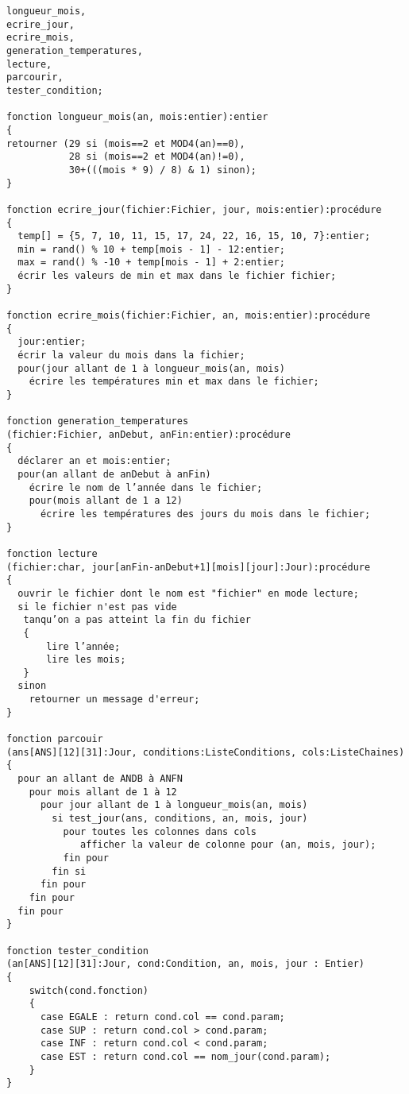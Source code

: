 \begin{lstlisting}
longueur_mois,
ecrire_jour,
ecrire_mois,
generation_temperatures,
lecture,
parcourir,
tester_condition;

fonction longueur_mois(an, mois:entier):entier
{
retourner (29 si (mois==2 et MOD4(an)==0),
           28 si (mois==2 et MOD4(an)!=0),
           30+(((mois * 9) / 8) & 1) sinon);
}

fonction ecrire_jour(fichier:Fichier, jour, mois:entier):procédure 
{
  temp[] = {5, 7, 10, 11, 15, 17, 24, 22, 16, 15, 10, 7}:entier;
  min = rand() % 10 + temp[mois - 1] - 12:entier;
  max = rand() % -10 + temp[mois - 1] + 2:entier;
  écrir les valeurs de min et max dans le fichier fichier;
}

fonction ecrire_mois(fichier:Fichier, an, mois:entier):procédure
{
  jour:entier;
  écrir la valeur du mois dans la fichier;
  pour(jour allant de 1 à longueur_mois(an, mois) 
    écrire les températures min et max dans le fichier;
}

fonction generation_temperatures
(fichier:Fichier, anDebut, anFin:entier):procédure
{
  déclarer an et mois:entier;
  pour(an allant de anDebut à anFin)
    écrire le nom de l’année dans le fichier;
    pour(mois allant de 1 a 12) 
      écrire les températures des jours du mois dans le fichier;
}

fonction lecture
(fichier:char, jour[anFin-anDebut+1][mois][jour]:Jour):procédure 
{
  ouvrir le fichier dont le nom est "fichier" en mode lecture;
  si le fichier n'est pas vide
   tanqu’on a pas atteint la fin du fichier
   {
       lire l’année;
       lire les mois;
   }
  sinon 
    retourner un message d'erreur;
}

fonction parcouir
(ans[ANS][12][31]:Jour, conditions:ListeConditions, cols:ListeChaines)
{
  pour an allant de ANDB à ANFN
    pour mois allant de 1 à 12
      pour jour allant de 1 à longueur_mois(an, mois)
        si test_jour(ans, conditions, an, mois, jour)
	      pour toutes les colonnes dans cols
	         afficher la valeur de colonne pour (an, mois, jour);
	      fin pour        
        fin si
      fin pour
    fin pour
  fin pour
}

fonction tester_condition
(an[ANS][12][31]:Jour, cond:Condition, an, mois, jour : Entier)
{
	switch(cond.fonction)
	{
	  case EGALE : return cond.col == cond.param;
	  case SUP : return cond.col > cond.param;
	  case INF : return cond.col < cond.param;
	  case EST : return cond.col == nom_jour(cond.param);
	}
}


\end{lstlisting}